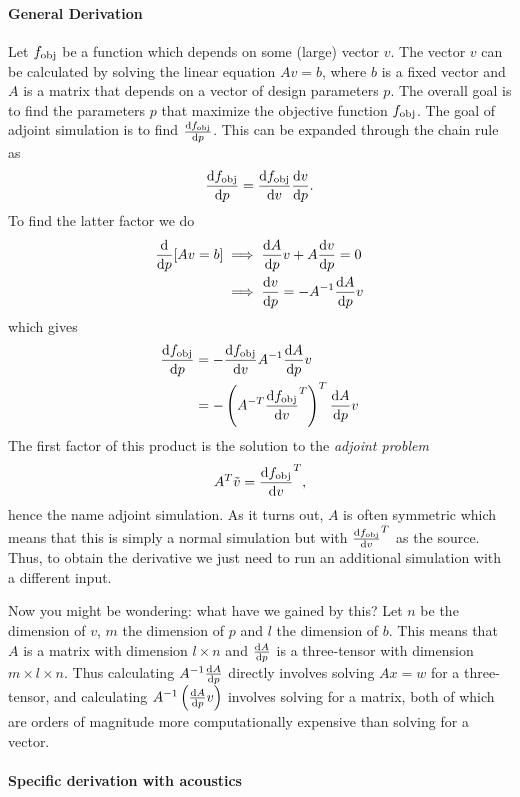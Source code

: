 \documentclass[11pt]{article}
\begin{document}
\paragraph{General Derivation}

Let $f_\text{obj}$ be a function which depends on some (large) vector $v$.
The vector $v$ can be calculated by solving the linear equation
$A v = b$, where $b$ is a fixed vector and $A$ is a matrix that depends on a
vector of design parameters $p$.
The overall goal is to find the parameters $p$ that maximize the objective
function $f_\text{obj}$.
The goal of adjoint simulation is to find $\diff{\fobj}{p}$.
This can be expanded through the chain rule as
\[
	\diff{\fobj}{p} = \diff{\fobj}{v} \diff{v}{p}.
\]
To find the latter factor we do
\begin{align*}
	\diff{}{p} [Av = b] &\implies \diff{A}{p} v + A \diff{v}{p} = 0\\
						&\implies \diff{v}{p} = -A^{-1} \diff{A}{p} v
\end{align*}
which gives
\begin{align}
	\diff{\fobj}{p} &= - \diff{\fobj}{v} A^{-1} \diff{A}{p}
	v\label{eq:no_adj_sim}\\
	&= - \left(A^{-T} \diff{\fobj}{v}^T \right)^T \diff{A}{p} v
\end{align}
The first factor of this product is the solution to the \emph{adjoint problem}
\begin{equation}
	A^T \tilde v = \diff{\fobj}{v}^T,
\end{equation}
hence the name adjoint simulation.
As it turns out, $A$ is often symmetric which means that this is simply a normal
simulation but with $\diff{\fobj}{v}^T$ as the source.
Thus, to obtain the derivative we just need to run an additional
simulation with a different input.

Now you might be wondering: what have we gained by this?
Let $n$ be the dimension of $v$, $m$ the dimension of $p$ and $l$ the dimension
of $b$.
This means that $A$ is a matrix with dimension $l\times n$ and $\diff{A}{p}$ is
a three-tensor with dimension $m\times l\times n$.
Thus calculating $A^{-1} \diff{A}{p}$ directly involves solving $Ax = w$ for a
three-tensor, and calculating $A^{-1} \left(\diff{A}{p} v\right)$
involves solving for a matrix, both of which are orders of magnitude more
computationally expensive than solving for a vector.

\paragraph{Specific derivation with acoustics}
\end{document}
